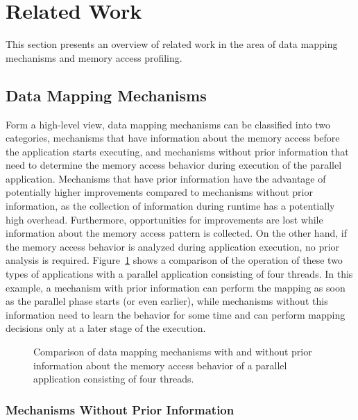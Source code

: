 
\section{Related Work}
\label{sec:soa}

This section presents an overview of related work in the area of data mapping mechanisms and memory access profiling.

\subsection{Data Mapping Mechanisms}
\label{sec:soa-mapping}

Form a high-level view, data mapping mechanisms can be classified into two categories, mechanisms that have information about the memory access before the application starts executing, and mechanisms without prior information that need to determine the memory access behavior during execution of the parallel application.
Mechanisms that have prior information have the advantage of potentially higher improvements compared to mechanisms without prior information, as the collection of information during runtime has a potentially high overhead.
Furthermore, opportunities for improvements are lost while information about the memory access pattern is collected.
On the other hand, if the memory access behavior is analyzed during application execution, no prior analysis is required.
Figure~\ref{fig:timeline} shows a comparison of the operation of these two types of applications with a parallel application consisting of four threads.
In this example, a mechanism with prior information can perform the mapping as soon as the parallel phase starts (or even earlier), while mechanisms without this information need to learn the behavior for some time and can perform mapping decisions only at a later stage of the execution.

\begin{figure}[!b]
    
    \caption{Comparison of data mapping mechanisms with and without prior information about the memory access behavior of a parallel application consisting of four threads.}
    \label{fig:timeline}
\end{figure}

\subsubsection{Mechanisms Without Prior Information}

